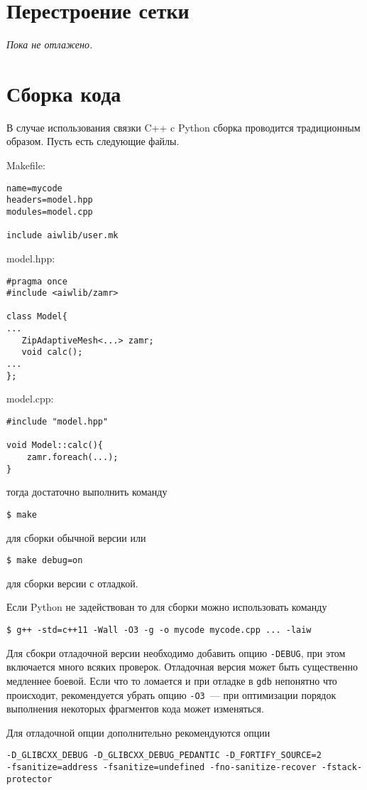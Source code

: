 \documentclass[12pt]{article}
\begin{document}
\section{Перестроение сетки}
{\it Пока не отлажено.}

\section{Сборка кода}
В случае использования связки C++ c Python сборка проводится традиционным образом. Пусть есть следующие файлы.

Makefile:
\begin{verbatim}
name=mycode
headers=model.hpp
modules=model.cpp

include aiwlib/user.mk
\end{verbatim}

model.hpp:
\begin{verbatim}
#pragma once
#include <aiwlib/zamr>

class Model{
...
   ZipAdaptiveMesh<...> zamr;
   void calc(); 
...
};
\end{verbatim}

model.cpp:
\begin{verbatim}
#include "model.hpp"

void Model::calc(){
    zamr.foreach(...);
}
\end{verbatim}
тогда достаточно выполнить команду 
\begin{verbatim}
$ make
\end{verbatim}
для сборки обычной версии или
\begin{verbatim}
$ make debug=on
\end{verbatim}
для сборки версии с отладкой.

Если Python не задействован то для сборки можно использовать команду 
\begin{verbatim}
$ g++ -std=c++11 -Wall -O3 -g -o mycode mycode.cpp ... -laiw
\end{verbatim}
Для сбокри отладочной версии необходимо добавить опцию \verb'-DEBUG', при этом включается много всяких проверок. Отладочная версия может быть существенно медленнее боевой.
Если что то ломается и при отладке в \verb'gdb' непонятно что происходит, рекомендуется убрать опцию \verb'-O3'~--- при оптимизации порядок выполнения
некоторых фрагментов кода может изменяться.

Для отладочной опции дополнительно рекомендуются опции
\begin{verbatim}
-D_GLIBCXX_DEBUG -D_GLIBCXX_DEBUG_PEDANTIC -D_FORTIFY_SOURCE=2 
-fsanitize=address -fsanitize=undefined -fno-sanitize-recover -fstack-protector
\end{verbatim}
 
 
\end{document}
